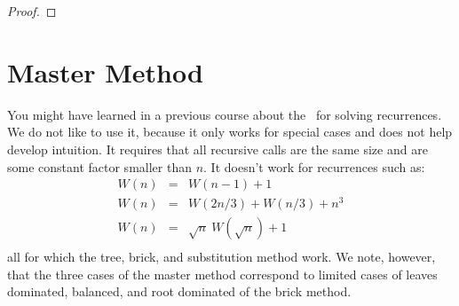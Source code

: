 \begin{flex}
\begin{proof}
\end{proof}
\end{flex}


\section{Master Method}
\label{sec:analysis::recurrences::master-method}

\begin{cluster}
\label{grp:grm:analysis::recurrences::might}

\begin{gram}
\label{grm:analysis::recurrences::might}
You might have learned in a previous course about the~ for solving
recurrences.
We do not like to use it, because it only works for special cases and
does not help develop intuition.     
It requires that all recursive calls are the same size and are some
constant factor smaller than $n$.
It doesn't work for recurrences such as:
\[
\begin{array}{lcl}
W(n) & = & W(n - 1) + 1 \\
W(n) & = & W(2n / 3) + W(n /3) + n^3\\
W(n) & = & \sqrt{n}~W(\sqrt{n}) + 1\\
\end{array}
\]
all for which the tree, brick, and substitution method work.
We note, however, that the three cases of the master method correspond
to limited cases of leaves dominated, balanced, and root dominated of
the brick method.

\end{gram}
\end{cluster}

